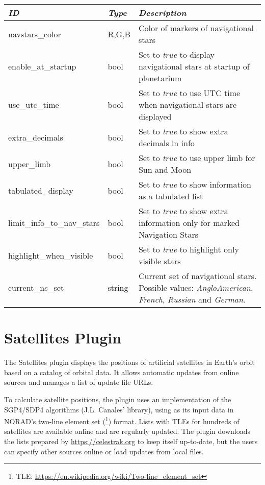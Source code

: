 \noindent%
\begin{tabularx}{\textwidth}{l|l|X}\toprule
\emph{ID}              & \emph{Type} & \emph{Description}\\\midrule
navstars\_color             & R,G,B  & Color of markers of navigational stars  \\
enable\_at\_startup         & bool   & Set to \emph{true} to display navigational stars at startup of planetarium  \\
use\_utc\_time              & bool   & Set to \emph{true} to use UTC time when navigational stars are displayed \\
extra\_decimals             & bool   & Set to \emph{true} to show extra decimals in info \\
upper\_limb                 & bool   & Set to \emph{true} to use upper limb for Sun and Moon \\
tabulated\_display          & bool   & Set to \emph{true} to show information as a tabulated list \\
limit\_info\_to\_nav\_stars & bool   & Set to \emph{true} to show extra information only for marked Navigation Stars \\ 
highlight\_when\_visible    & bool   & Set to \emph{true} to highlight only visible stars \\
current\_ns\_set            & string & Current set of navigational stars. Possible values: \emph{AngloAmerican}, \emph{French}, \emph{Russian} and \emph{German}. \\
\bottomrule
\end{tabularx}


\newpage
\section{Satellites Plugin}
\label{sec:plugins:Satellites}


\noindent The Satellites plugin displays the positions of artificial satellites in Earth's orbit based on a catalog of orbital data. It allows
automatic updates from online sources and manages a list of update
file URLs.

To calculate satellite positions, the plugin uses an implementation of
the SGP4/SDP4 algorithms (J.L. Canales'  library), using
as its input data in NORAD's two-line element set
(\footnote{TLE: \url{https://en.wikipedia.org/wiki/Two-line_element_set}})
format. Lists with TLEs for hundreds of satellites are available
online and are regularly updated. The plugin downloads the lists
prepared by \url{https://celestrak.org} to keep itself up-to-date, but the users can
specify other sources online or load updates from local files.

